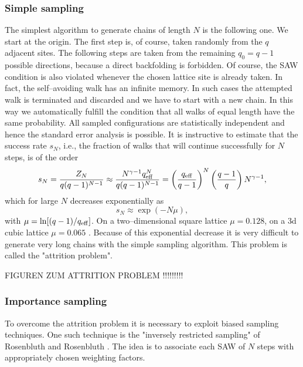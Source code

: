\subsubsection{Simple sampling}
The simplest algorithm to generate chains of  length $N$ is the 
following one. We start at the origin. The first step is, of 
course,  taken randomly from the $q$ adjacent sites. The following 
steps are taken from the remaining $q_0=q-1$ possible directions, 
because a direct backfolding is forbidden. Of course, the SAW 
condition is also violated whenever the chosen lattice site is 
already taken. In fact, the self--avoiding walk has an infinite
memory. In such cases the attempted walk is terminated and 
discarded and we have to start with a new chain. In this way we 
automatically fulfill the condition that all walks  of equal 
length have the same probability. All sampled configurations are 
statistically independent and hence the standard error analysis 
is possible. It is instructive to estimate that the success rate
$s_N$, i.e., the fraction of walks that will continue successfully 
for $N$ steps, is of the order
\begin{equation*}
s_N = \frac{Z_N}{q(q-1)^{N-1}} \approx
      \frac{N^{\gamma -1} q_{\rm eff}^N}{q(q-1)^{N-1}}
       = \left( \frac{q_{\rm eff}}{q-1}\right)^N 
         \left( \frac{q-1}{q} \right) N^{\gamma -1},
\end{equation*}
which for large $N$ decreases exponentially as
\begin{equation*}
s_N \approx \exp(-N \mu),
\end{equation*}
with $\mu=\ln[(q-1)/q_{\rm eff}]$. 
On a two--dimensional square lattice $\mu = 0.128$, on a 3d cubic lattice
$\mu = 0.065$ \cite{KREMER_AND_BINDER}. Because of this exponential 
decrease it is very  difficult to generate very long chains with 
the simple sampling algorithm. This problem is called the 
"attrition problem".

FIGUREN ZUM ATTRITION PROBLEM !!!!!!!!!

\subsubsection{Importance sampling}
To overcome the attrition problem it is necessary to exploit 
biased sampling techniques. One such technique is the "inversely
restricted sampling" of Rosenbluth and Rosenbluth \cite{ROSENBLUTH}. 
The idea is to
associate each SAW of $N$ steps with appropriately chosen weighting 
factors. 

